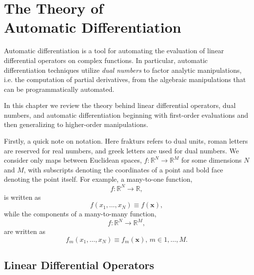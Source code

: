 \chapter{The Theory of \\ Automatic Differentiation}

Automatic differentiation is a tool for automating the evaluation of linear differential
operators on complex functions.  In particular, automatic differentiation techniques
utilize \textit{dual numbers} to factor analytic manipulations, i.e. the computation of
partial derivatives, from the algebraic manipulations that can be programmatically
automated.

In this chapter we review the theory behind linear differential operators, dual numbers,
and automatic differentiation beginning with first-order evaluations and then generalizing 
to higher-order manipulations.

Firstly, a quick note on notation.  Here frakturs refers to dual units, roman letters are 
reserved for real numbers, and greek letters are used for dual numbers.  We consider 
only maps between Euclidean spaces, $f : \mathbb{R}^{N} \rightarrow \mathbb{R}^{M}$ 
for some dimensions $N$ and $M$, with subscripts denoting the coordinates of a point
and bold face denoting the point itself. For example, a many-to-one function,
%
\begin{equation*}
f : \mathbb{R}^{N} \rightarrow \mathbb{R},
\end{equation*}
%
is written as
%
\begin{equation*}
f \! \left( x_{1}, \ldots, x_{N} \right) \equiv f \! \left( \mathbf{x} \right),
\end{equation*} 
%
while the components of a many-to-many function,
%
\begin{equation*}
f : \mathbb{R}^{N} \rightarrow \mathbb{R}^{M},
\end{equation*}
%
are written as
%
\begin{equation*}
f_{m} \! \left( x_{1}, \ldots, x_{N} \right) \equiv f_{m} \! \left( \mathbf{x} \right), \, m \in 1, \ldots, M.
\end{equation*} 

\section{Linear Differential Operators}

